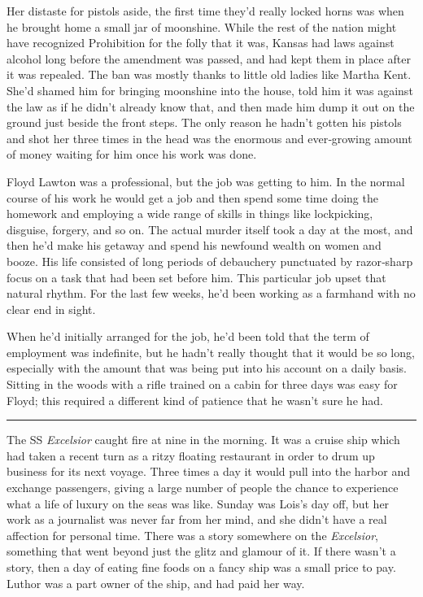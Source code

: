 \documentclass[ebook,12pt]{memoir}
\begin{document}
Her distaste for pistols aside, the first time they'd really locked
horns was when he brought home a small jar of moonshine. While the rest
of the nation might have recognized Prohibition for the folly that it
was, Kansas had laws against alcohol long before the amendment was
passed, and had kept them in place after it was repealed. The ban was
mostly thanks to little old ladies like Martha Kent. She'd shamed him
for bringing moonshine into the house, told him it was against the law
as if he didn't already know that, and then made him dump it out on the
ground just beside the front steps. The only reason he hadn't gotten his
pistols and shot her three times in the head was the enormous and
ever‐growing amount of money waiting for him once his work was done.

Floyd Lawton was a professional, but the job was getting to him. In the
normal course of his work he would get a job and then spend some time
doing the homework and employing a wide range of skills in things like
lockpicking, disguise, forgery, and so on. The actual murder itself took
a day at the most, and then he'd make his getaway and spend his newfound
wealth on women and booze. His life consisted of long periods of
debauchery punctuated by razor‐sharp focus on a task that had been set
before him. This particular job upset that natural rhythm. For the last
few weeks, he'd been working as a farmhand with no clear end in sight.

When he'd initially arranged for the job, he'd been told that the term
of employment was indefinite, but he hadn't really thought that it would
be so long, especially with the amount that was being put into his
account on a daily basis. Sitting in the woods with a rifle trained on a
cabin for three days was easy for Floyd; this required a different kind
of patience that he wasn't sure he had.

\begin{center}\rule{0.5\linewidth}{\linethickness}\end{center}

The SS \emph{Excelsior} caught fire at nine in the morning. It was a
cruise ship which had taken a recent turn as a ritzy floating restaurant
in order to drum up business for its next voyage. Three times a day it
would pull into the harbor and exchange passengers, giving a large
number of people the chance to experience what a life of luxury on the
seas was like. Sunday was Lois's day off, but her work as a journalist
was never far from her mind, and she didn't have a real affection for
personal time. There was a story somewhere on the \emph{Excelsior},
something that went beyond just the glitz and glamour of it. If there
wasn't a story, then a day of eating fine foods on a fancy ship was a
small price to pay. Luthor was a part owner of the ship, and had paid
her way.
\end{document}
